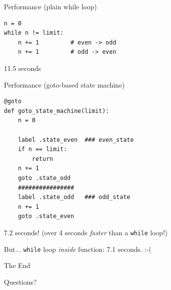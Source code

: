 \documentclass{beamer}
\begin{document}
\begin{frame}[fragile]{Performance (plain while loop)}
\begin{verbatim}
n = 0
while n != limit:
    n += 1         # even -> odd
    n += 1         # odd -> even
\end{verbatim}
\alert{11.5 seconds}
\end{frame}

\begin{frame}[fragile]{Performance (goto-based state machine)}
\begin{verbatim}
@goto
def goto_state_machine(limit):
    n = 0

    label .state_even  ### even_state
    if n == limit:
        return
    n += 1
    goto .state_odd
    ################
    label .state_odd   ### odd_state
    n += 1
    goto .state_even
\end{verbatim}
\pause
\alert{7.2 seconds!}  (over 4 seconds \emph{faster} than a \verb!while! loop!)

\pause
But... \verb!while! loop \emph{inside} function: \alert{7.1 seconds.} :-(
\end{frame}

\begin{frame}[fragile]{The End}

Questions?%

\end{frame}
\end{document}
